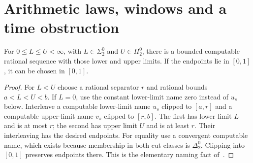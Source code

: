 \section{Arithmetic laws, windows and a time obstruction}\label{sec:scales}
\begin{lemma}\label{lem:names}
For $0\le L\le U<\infty$, with $L\in\Sigma^0_2$ and $U\in\Pi^0_2$, there is a bounded computable rational sequence with those lower and upper limits. If the endpoints lie in $[0,1]$, it can be chosen in $[0,1]$.
\end{lemma}
\begin{proof}
For $L<U$ choose a rational separator $r$ and rational bounds $a<L<U<b$. If $L=0$, use the constant lower-limit name zero instead of $u_s$ below. Interleave a computable lower-limit name $u_s$ clipped to $[a,r]$ and a computable upper-limit name $v_s$ clipped to $[r,b]$. The first has lower limit $L$ and is at most $r$; the second has upper limit $U$ and is at least $r$. Their interleaving has the desired endpoints. For equality use a convergent computable name, which exists because membership in both cut classes is $\Delta^0_2$. Clipping into $[0,1]$ preserves endpoints there. This is the elementary naming fact of~\cite[Lemma Q4.1]{UP}.
\end{proof}

